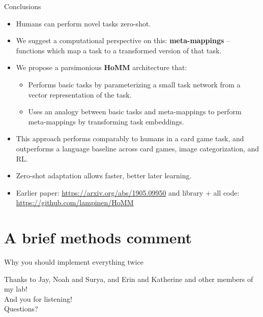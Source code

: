 \documentclass{beamer}
\begin{document}
\begin{frame}{Conclusions}

\begin{itemize}
\item Humans can perform novel tasks zero-shot. 
\item We suggest a computational perspective on this: \textbf{meta-mappings} -- functions which map a task to a transformed version of that task. 
\item We propose a parsimonious \textbf{HoMM} architecture that: 
    \begin{itemize}
    \item Performs basic tasks by parameterizing a small task network from a vector representation of the task. 
    \item Uses an analogy between basic tasks and meta-mappings to perform meta-mappings by transforming task embeddings. 
    \end{itemize}
\item This approach performs comparably to humans in a card game task, and outperforms a language baseline across card games, image categorization, and RL.
\item Zero-shot adaptation allows faster, better later learning. 
\item Earlier paper: \url{https://arxiv.org/abs/1905.09950} and library + all code: \url{https://github.com/lampinen/HoMM}
\end{itemize}
\end{frame}

\section{A brief methods comment}
\begin{frame}{Why you should implement everything twice}
\end{frame}

\begin{frame}[standout]
Thanks to Jay, Noah and Surya, and Erin and Katherine and other members of my lab! \\[1em]
And you for listening! \\[1em]
Questions?
\end{frame}
\end{document}
